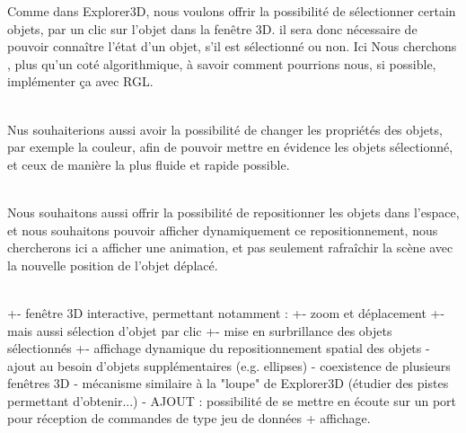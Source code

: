 Comme dans Explorer3D, nous voulons offrir la possibilité de sélectionner certain objets, par un clic sur l'objet dans la fenêtre 3D. il sera donc nécessaire de pouvoir connaître l'état d'un objet, s’il est sélectionné ou non. Ici Nous cherchons , plus qu'un coté algorithmique, à savoir comment pourrions nous, si possible, implémenter ça avec RGL. 
\\\\\indent

Nus souhaiterions aussi avoir la possibilité de changer les propriétés des objets, par exemple la couleur, afin de pouvoir mettre en évidence les objets sélectionné, et ceux de manière la plus fluide et rapide possible.
\\\\\indent

Nous souhaitons aussi offrir la possibilité de repositionner les objets dans l'espace, et nous souhaitons pouvoir afficher dynamiquement ce repositionnement, nous chercherons ici a afficher une animation, et pas seulement rafraîchir la scène avec la nouvelle position de l'objet déplacé. 
\\\\\indent


+- fenêtre 3D interactive, permettant notamment :
+- zoom et déplacement
+- mais aussi sélection d'objet par clic
+- mise en surbrillance des objets sélectionnés
+- affichage dynamique du repositionnement spatial des objets
 - ajout au besoin d'objets supplémentaires (e.g. ellipses)
- coexistence de plusieurs fenêtres 3D
- mécanisme similaire à la "loupe" de Explorer3D (étudier des pistes permettant d'obtenir...)
- AJOUT : possibilité de se mettre en écoute sur un port pour réception de commandes de type jeu de données + affichage.

\newpage